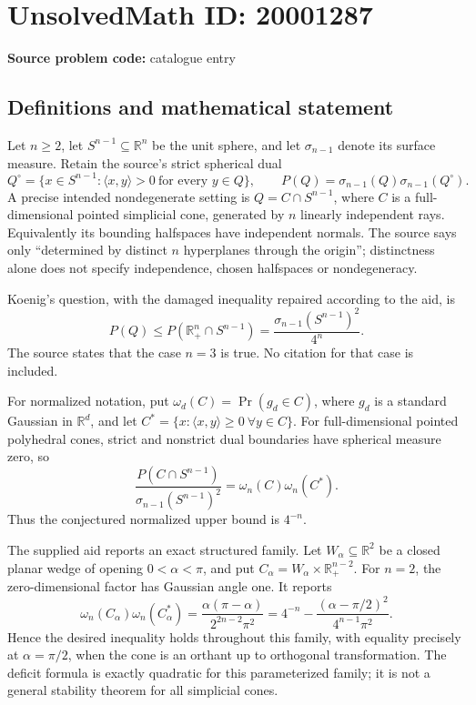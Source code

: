 \documentclass[11pt]{article}
\newcommand{\R}{\mathbb{R}}
\begin{document}
\section*{UnsolvedMath ID: 20001287}
\textbf{Source problem code:} catalogue entry
\subsection{Definitions and mathematical statement}
Let \(n\geq2\), let \(S^{n-1}\subseteq\R^n\) be the unit sphere, and let \(\sigma_{n-1}\) denote its surface measure. Retain the source's strict spherical dual
\[
 Q^\circ=\{x\in S^{n-1}:\langle x,y\rangle>0\ \text{for every }y\in Q\},\qquad
 P(Q)=\sigma_{n-1}(Q)\sigma_{n-1}(Q^\circ).
\]
A precise intended nondegenerate setting is \(Q=C\cap S^{n-1}\), where \(C\) is a full-dimensional pointed simplicial cone, generated by \(n\) linearly independent rays. Equivalently its bounding halfspaces have independent normals. The source says only ``determined by distinct \(n\) hyperplanes through the origin''; distinctness alone does not specify independence, chosen halfspaces or nondegeneracy.

Koenig's question, with the damaged inequality repaired according to the aid, is
\[
 P(Q)\leq P(\R_+^n\cap S^{n-1})
 =\frac{\sigma_{n-1}(S^{n-1})^2}{4^n}.
\]
The source states that the case \(n=3\) is true. No citation for that case is included.

For normalized notation, put \(\omega_d(C)=\Pr(g_d\in C)\), where \(g_d\) is a standard Gaussian in \(\R^d\), and let
\(C^*=\{x:\langle x,y\rangle\geq0\ \forall y\in C\}\).
For full-dimensional pointed polyhedral cones, strict and nonstrict dual boundaries have spherical measure zero, so
\[
 \frac{P(C\cap S^{n-1})}{\sigma_{n-1}(S^{n-1})^2}
 =\omega_n(C)\omega_n(C^*).
\]
Thus the conjectured normalized upper bound is \(4^{-n}\).

The supplied aid reports an exact structured family. Let \(W_\alpha\subseteq\R^2\) be a closed planar wedge of opening \(0<\alpha<\pi\), and put \(C_\alpha=W_\alpha\times\R_+^{n-2}\). For \(n=2\), the zero-dimensional factor has Gaussian angle one. It reports
\[
 \omega_n(C_\alpha)\omega_n(C_\alpha^*)
 =\frac{\alpha(\pi-\alpha)}{2^{2n-2}\pi^2}
 =4^{-n}-\frac{(\alpha-\pi/2)^2}{4^{n-1}\pi^2}.
\]
Hence the desired inequality holds throughout this family, with equality precisely at \(\alpha=\pi/2\), when the cone is an orthant up to orthogonal transformation. The deficit formula is exactly quadratic for this parameterized family; it is not a general stability theorem for all simplicial cones.
\end{document}
